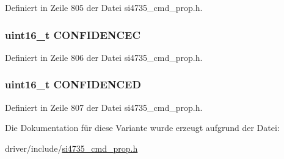 Definiert in Zeile 805 der Datei si4735\+\_\+cmd\+\_\+prop.\+h.

\hypertarget{unionfm__rds__confidence_ab0a4bcb0b2e578ddbbbc4e33767a7df2}{}
\subsubsection[{C\+O\+N\+F\+I\+D\+E\+N\+C\+E\+C}]{\setlength{\rightskip}{0pt plus 5cm}uint16\+\_\+t C\+O\+N\+F\+I\+D\+E\+N\+C\+E\+C}\label{unionfm__rds__confidence_ab0a4bcb0b2e578ddbbbc4e33767a7df2}


Definiert in Zeile 806 der Datei si4735\+\_\+cmd\+\_\+prop.\+h.

\hypertarget{unionfm__rds__confidence_af81bc38f41af0228eb6a646489ad2e3a}{}
\subsubsection[{C\+O\+N\+F\+I\+D\+E\+N\+C\+E\+D}]{\setlength{\rightskip}{0pt plus 5cm}uint16\+\_\+t C\+O\+N\+F\+I\+D\+E\+N\+C\+E\+D}\label{unionfm__rds__confidence_af81bc38f41af0228eb6a646489ad2e3a}


Definiert in Zeile 807 der Datei si4735\+\_\+cmd\+\_\+prop.\+h.



Die Dokumentation für diese Variante wurde erzeugt aufgrund der Datei\+:\begin{DoxyCompactItemize}
\item 
driver/include/\hyperlink{si4735__cmd__prop_8h}{si4735\+\_\+cmd\+\_\+prop.\+h}\end{DoxyCompactItemize}
